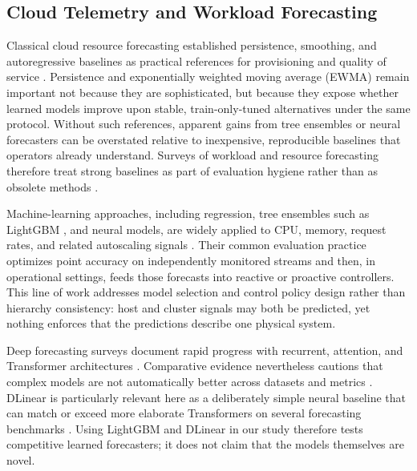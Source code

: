 \documentclass[a4paper,fleqn]{cas-dc}
\begin{document}
\subsection{Cloud Telemetry and Workload Forecasting}
Classical cloud resource forecasting established persistence, smoothing, and
autoregressive baselines as practical references for provisioning and quality of
service
\cite{calheiros2015workload,islam2012empirical}.
Persistence and exponentially weighted moving average ({EWMA}) remain important
not because they are sophisticated, but because they expose whether learned
models improve upon stable, train-only-tuned alternatives under the same
protocol.
Without such references, apparent gains from tree ensembles or neural forecasters
can be overstated relative to inexpensive, reproducible baselines that operators
already understand.
Surveys of workload and resource forecasting therefore treat strong baselines as
part of evaluation hygiene rather than as obsolete methods
\cite{masdari2020workload,lorido2014review}.

Machine-learning approaches, including regression, tree ensembles such as
LightGBM
\cite{ke2017lightgbm},
and neural models, are widely applied to {CPU}, memory, request rates, and
related autoscaling signals
\cite{khan2022workload,qu2018auto,toka2021kubernetes}.
Their common evaluation practice optimizes point accuracy on independently
monitored streams and then, in operational settings, feeds those forecasts into
reactive or proactive controllers.
This line of work addresses model selection and control policy design rather
than hierarchy consistency: host and cluster signals may both be predicted, yet
nothing enforces that the predictions describe one physical system.

Deep forecasting surveys document rapid progress with recurrent, attention, and
Transformer architectures
\cite{lim2021temporal,wen2023transformers}.
Comparative evidence nevertheless cautions that complex models are not
automatically better across datasets and metrics
\cite{makridakis2018statistical,zeng2023dlinear}.
DLinear is particularly relevant here as a deliberately simple neural baseline
that can match or exceed more elaborate Transformers on several forecasting
benchmarks
\cite{zeng2023dlinear}.
Using LightGBM and DLinear in our study therefore tests competitive learned
forecasters; it does not claim that the models themselves are novel.
\end{document}
